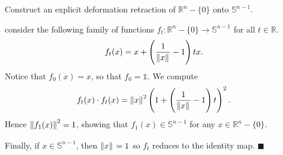 \question Construct an explicit deformation retraction of $\mathbb{R}^n - \{0\}$ 
onto $\mathbb{S}^{n-1}$.

\begin{solution}
    consider the following family of functions $f_t: \mathbb{R}^n - \{0\}
    \rightarrow \mathbb{S}^{n-1}$ for all $t \in \mathbb{R}$.
    \begin{equation*}
        f_t(x) = x + \left( \frac{1}{\left\|{x}\right\|_{{}_{}}} - 1 \right)tx.
    \end{equation*}
    Notice that $f_0(x) = x$, so that $f_0 = \mathbb{1}$. We compute
    \begin{equation*}
        f_t(x) \cdot f_t(x) = \left\|{x}\right\|_{{}_{}}^2 \left( 1 + \left( 
            \frac{1}{\left\|{x}\right\|_{{}_{}}} - 1 \right)t \right)^2.
    \end{equation*}
    Hence $\left\|{f_1(x)}\right\|_{{}_{}}^2 = 1$, showing that $f_1(x) \in \mathbb{S}^{n-1}$ 
    for any $x \in \mathbb{R}^n - \{0\}$.

    Finally, if $x \in \mathbb{S}^{n-1}$, then $\left\|{x}\right\|_{{}_{}} = 1$ so $f_t$ reduces 
    to the identity map. \hfill $\blacksquare$
\end{solution}